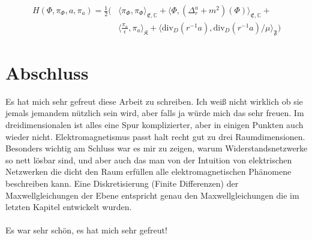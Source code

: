 \documentclass[11pt,a4paper,leqno]{report}
\numberwithin{equation}{chapter}
\begin{document}
\begin{align*}
	H(\Phi, \pi_\Phi, a, \pi_a) = \frac{1}{2}(&\langle \pi_\Phi, \pi_\Phi\rangle_{\mathfrak{E},\mathbb{C}}+\langle \Phi, (\Delta_r^a + m^2)(\Phi)\rangle_{\mathfrak{E},\mathbb{C}}+\\ &\langle \frac{\pi_a}{\epsilon}, \pi_a\rangle_{\mathfrak{K}} + \langle \text{div}_D(r^{-1}a), \text{div}_D(r^{-1}a)/\mu\rangle_{\mathfrak{F}}) 
\end{align*}	
\chapter*{Abschluss}
Es hat mich sehr gefreut diese Arbeit zu schreiben. Ich wei\ss{} nicht wirklich ob sie jemals jemandem n\"utzlich sein wird, aber falls ja w\"urde mich das sehr freuen. Im dreidimensionalen ist alles eine Spur komplizierter, aber in einigen Punkten auch wieder nicht. Elektromagnetismus passt halt recht gut zu drei Raumdimensionen. Besonders wichtig am Schluss war es mir zu zeigen, warum Widerstandsnetzwerke so nett l\"osbar sind, und aber auch das man von der Intuition von elektrischen Netzwerken die dicht den Raum erf\"ullen alle elektromagnetischen Ph\"anomene beschreiben kann. Eine Diskretisierung (Finite Differenzen) der Maxwellgleichungen der Ebene entspricht genau den Maxwellgleichungen die im letzten Kapitel entwickelt wurden. \\
\\
Es war sehr sch\"on, es hat mich sehr gefreut!
\end{document}
